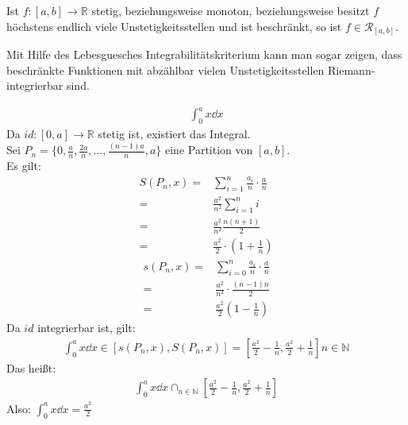\begin{Korollar}{
	Ist $f:[a,b] \rightarrow \mathbb{R}$ stetig, beziehungsweise monoton, beziehungsweise 
	besitzt $f$ höchstens endlich viele Unstetigkeitsstellen und ist beschränkt, so ist 
	$f \in \mathcal{R}_{[a,b]}$.
}\end{Korollar}

\begin{Bemerkung}{
	Mit Hilfe des Lebesguesches Integrabilitätskriterium kann man 
	sogar zeigen, dass beschränkte Funktionen mit abzählbar vielen Unstetigkeitsstellen 
	Riemann-integrierbar sind.
}\end{Bemerkung}

\begin{Beispiel}{
	\begin{align*}
		\int_0^a x \dd{x}
	\end{align*}
	Da $id :[0,a] \rightarrow \mathbb{R}$ stetig ist, existiert das Integral. \\
	Sei $P_n =\{ 0, \frac{a}{n}, \frac{2a}{n}, \hdots, \frac{(n-1)a}{n}, a\}$ 
	eine Partition von $[a,b]$. \\
	Es gilt: 
	\begin{align*}
		S(P_n, x) = & \sum_{i =1} ^n \frac{a_i}{n} \cdot \frac{a}{n} \\
		= & \frac{a^2}{n^2} \sum_{i = 1}^n i \\
		= & \frac{a^2}{n^2} \frac{n(n+1)}{2} \\ 
		= & \frac{a^2}{2} \cdot \left( 1 + \frac{1}{n} \right)
	\end{align*}
	\begin{align*}
		s(P_n, x) = & \sum_{i = 0}^n \frac{a_i}{n} \cdot \frac{a}{n}  \\
		= & \frac{a^2}{n^2} \cdot \frac{(n-1)n}{2} \\
		= & \frac{a^2}{2}\left( 1 - \frac{1}{n} \right)
	\end{align*}
	Da $id$ integrierbar ist, gilt:
	\begin{align*}
		\int_0^a x \dd{x} \in \left[ s(P_n,x), S(P_n, x)\right] = 
		\left[\frac{a^2}{2}- \frac{1}{n}, \frac{a^2}{2}+\frac{1}{n}\right]
		n \in \mathbb{N}
	\end{align*}
	Das heißt:
	\begin{align*}
		\int_0^a x \dd{x} \cap_{n \in \mathbb{N}} \left[\frac{a^2}{2}- \frac{1}{n}, 
		\frac{a^2}{2}+\frac{1}{n}\right]
	\end{align*}
	Also: $\int_0^a x \dd{x} = \frac{a^2}{2}$
}\end{Beispiel}

